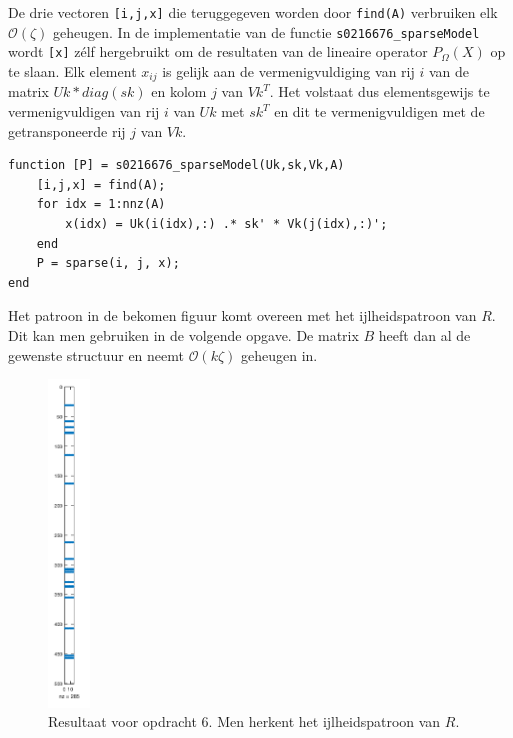 

De drie vectoren \texttt{[i,j,x]} die teruggegeven worden door \texttt{find(A)} verbruiken elk $\mathcal{O}(\zeta)$ geheugen. In de implementatie van de functie \texttt{s0216676\_sparseModel} wordt \texttt{[x]} z\'elf hergebruikt om de resultaten van de lineaire operator $P_{\Omega}(X)$ op te slaan. Elk element $x_{ij}$ is gelijk aan de vermenigvuldiging van rij $i$ van de matrix $Uk*diag(sk)$ en kolom $j$ van $Vk^T$. Het volstaat dus elementsgewijs te vermenigvuldigen van rij $i$ van $Uk$ met $sk^T$ en dit te vermenigvuldigen met de getransponeerde rij $j$ van $Vk$.

\begin{lstlisting}
function [P] = s0216676_sparseModel(Uk,sk,Vk,A)
    [i,j,x] = find(A);
    for idx = 1:nnz(A)
        x(idx) = Uk(i(idx),:) .* sk' * Vk(j(idx),:)';
    end
    P = sparse(i, j, x);
end
\end{lstlisting}



Het patroon in de bekomen figuur komt overeen met het ijlheidspatroon van $R$. Dit kan men gebruiken in de volgende opgave. De matrix $B$ heeft dan al de gewenste structuur en neemt $\mathcal{O}(k\zeta)$ geheugen in.

\begin{figure}[h]
\centering
\includegraphics[width=0.1\textwidth]{res/op6.png}
\caption{Resultaat voor opdracht 6. Men herkent het ijlheidspatroon van $R$.}
\label{fig:op6}
\end{figure}

